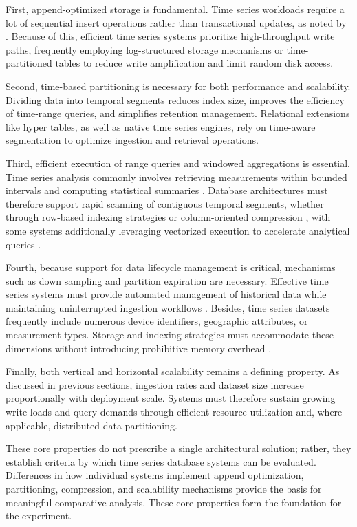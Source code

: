 First, append-optimized storage is fundamental. Time series workloads require a lot of sequential insert operations rather than transactional updates, as noted by \cite{Jensen2017}. Because of this, efficient time series systems prioritize high-throughput write paths, frequently employing log-structured storage mechanisms or time-partitioned tables to reduce write amplification and limit random disk access.

Second, time-based partitioning is necessary for both performance and scalability. Dividing data into temporal segments reduces index size, improves the efficiency of time-range queries, and simplifies retention management. Relational extensions like hyper tables, as well as native time series engines, rely on time-aware segmentation to optimize ingestion and retrieval operations.

Third, efficient execution of range queries and windowed aggregations is essential. Time series analysis commonly involves retrieving measurements within bounded intervals and computing statistical summaries \cite{Jensen2017}. Database architectures must therefore support rapid scanning of contiguous temporal segments, whether through row-based indexing strategies or column-oriented compression \cite{Jensen2017}, with some systems additionally leveraging vectorized execution to accelerate analytical queries \cite{clickhouse_architecture}.


Fourth, because support for data lifecycle management is critical, mechanisms such as down sampling and partition expiration are necessary. Effective time series systems must provide automated management of historical data while maintaining uninterrupted ingestion workflows \citep{iiot_world_retention2024}. Besides, time series datasets frequently include numerous device identifiers, geographic attributes, or measurement types. Storage and indexing strategies must accommodate these dimensions without introducing prohibitive memory overhead \citep{srivastava2026architectural}.

Finally, both vertical and horizontal scalability remains a defining property. As discussed in previous sections, ingestion rates and dataset size increase proportionally with deployment scale. Systems must therefore sustain growing write loads and query demands through efficient resource utilization and, where applicable, distributed data partitioning.


These core properties do not prescribe a single architectural solution; rather, they establish criteria by which time series database systems can be evaluated. Differences in how individual systems implement append optimization, partitioning, compression, and scalability mechanisms provide the basis for meaningful comparative analysis. These core properties form the foundation for the experiment. 



